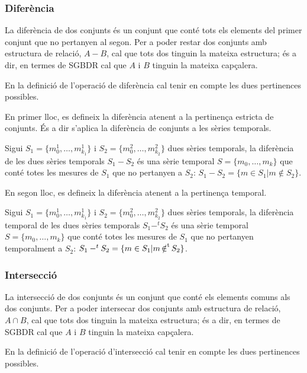 \subsubsection{Diferència}

La diferència de dos conjunts és un conjunt que conté tots els
elements del primer conjunt que no pertanyen al segon.  Per a poder
restar dos conjunts amb estructura de relació, $A - B$, cal que
tots dos tinguin la mateixa estructura; és a dir, en termes de SGBDR
cal que $A$ i $B$ tinguin la mateixa capçalera.

En la definició de l'operació de diferència cal tenir en compte les
dues pertinences possibles.

En primer lloc, es defineix la diferència atenent a la pertinença
estricta de conjunts. És a dir s'aplica la diferència de
conjunts a les sèries temporals.
\begin{definition}[diferència]
  Sigui $S_1=\{m_0^1, \dotsc, m_{k_1}^1\}$ i $S_2=\{m_0^2, \dotsc,
  m_{k_2}^2\}$ dues sèries temporals, la diferència de les dues
  sèries temporals $S_1 - S_2$ és una sèrie temporal $S=\{m_0,
  \dotsc, m_k\}$ que conté totes les mesures de $S_1$ que no pertanyen a
  $S_2$: $S_1 - S_2 = \{ m \in S_1 | m \notin S_2  \}$.
\end{definition}

En segon lloc, es defineix la diferència atenent a la pertinença
temporal.
\begin{definition}
  Sigui $S_1=\{m_0^1, \dotsc, m_{k_1}^1\}$ i $S_2=\{m_0^2, \dotsc,
  m_{k_2}^2\}$ dues sèries temporals, la diferència temporal de les
  dues sèries temporals $S_1 -^t S_2$ és una sèrie temporal
  $S=\{m_0, \dotsc, m_k\}$ que conté totes les mesures de $S_1$ que no
  pertanyen temporalment a $S_2$: $S_1 -^t S_2 = \{ m \in S_1 | m
  \operatorname*{\notin^t} S_2 \}$.
\end{definition}




\subsubsection{Intersecció}

La intersecció de dos conjunts és un conjunt que conté els elements
comuns als dos conjunts.  Per a poder intersecar dos conjunts amb estructura
de relació, $A \cap B$, cal que tots dos tinguin la mateixa
estructura; és a dir, en termes de SGBDR cal que $A$ i $B$ tinguin la
mateixa capçalera.

En la definició de l'operació d'intersecció cal tenir en compte les
dues pertinences possibles.

